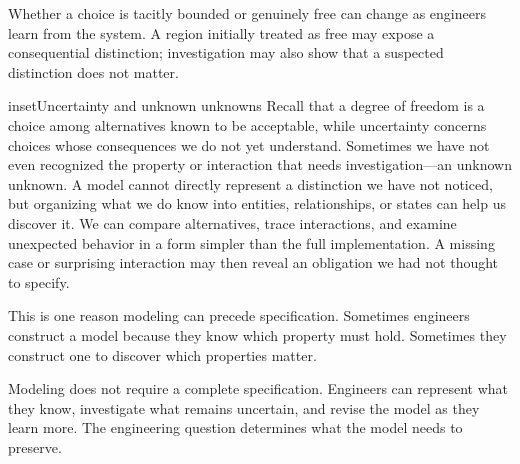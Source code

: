 
Whether a choice is tacitly bounded or genuinely free can change as engineers learn from the system. A region initially treated as free may expose a consequential distinction; investigation may also show that a suspected distinction does not matter.





\begin{bookbox}{inset}{Uncertainty and unknown unknowns}
\label{inset-uncertainty}
Recall that a degree of freedom is a choice among alternatives known to be acceptable, while uncertainty concerns choices whose consequences we do not yet understand. Sometimes we have not even recognized the property or interaction that needs investigation---an unknown unknown. A model cannot directly represent a distinction we have not noticed, but organizing what we do know into entities, relationships, or states can help us discover it. We can compare alternatives, trace interactions, and examine unexpected behavior in a form simpler than the full implementation. A missing case or surprising interaction may then reveal an obligation we had not thought to specify.

This is one reason modeling can precede specification. Sometimes engineers construct a model because they know which property must hold. Sometimes they construct one to discover which properties matter.
\end{bookbox}

Modeling does not require a complete specification. Engineers can represent what they know, investigate what remains uncertain, and revise the model as they learn more. The engineering question determines what the model needs to preserve.


